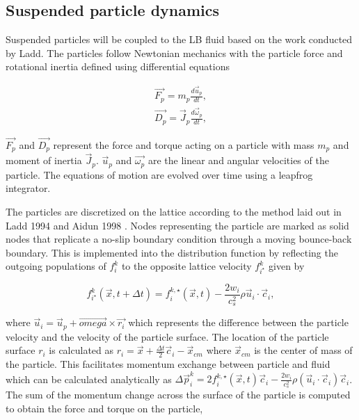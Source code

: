 
\subsection{Suspended particle dynamics}
\label{section:lbm_colloids}

Suspended particles will be coupled to the LB fluid based on the work conducted by Ladd. \cite{ladd_numerical_1994, 
aidun_direct_1998, ladd_lattice-boltzmann_2001} The particles follow Newtonian mechanics with the particle force and
rotational inertia defined using differential equations

\begin{equation}
    \begin{split}
    \vec{F_p} = m_p \frac{d \vec{u}_p}{dt} , \\
    \vec{D_p} = \vec{J}_p \frac{d \vec{\omega}_p}{dt} ,
    \label{eq:md}
    \end{split}
\end{equation}

$\vec{F_p}$ and $\vec{D_p}$ represent the force and torque acting on a particle with mass $m_p$ and moment of inertia 
$\vec{J}_p$. $\vec{u}_p$ and $\vec{\omega_{p}}$ are the linear and angular velocities of the particle. The equations of 
motion are evolved over time using a leapfrog integrator. \cite{jansen_bijels_2011}

The particles are discretized on the lattice according to the method laid out in Ladd 1994 and Aidun 1998
\cite{ladd_numerical_1994,aidun_direct_1998}. Nodes representing the particle are marked as solid nodes that replicate
a no-slip boundary condition through a moving bounce-back boundary. This is implemented into the distribution function
by reflecting the outgoing populations of $f_i^k$ to the opposite lattice velocity $f^k_{i^\star}$ given by

\begin{equation}
    f^k_{i^\star}(\vec{x}, t+\Delta t) = f^{k,\star}_i(\vec{x}, t) - \frac{2w_i}{c_s^2} \rho \vec{u}_i \cdot \vec{c}_i ,
\end{equation}

where $\vec{u}_i = \vec{u}_p + \vec{omega}\times \vec{r_i}$ which represents the difference between the particle velocity and the 
velocity of the particle surface. The location of the particle surface $r_i$ is calculated as $r_i = \vec{x} + \frac{\Delta t}{2}\vec{c}_i - \vec{x}_{cm}$ 
where $\vec{x}_{cm}$ is the center of mass of the particle.
This facilitates momentum exchange between particle and fluid which can be calculated analytically as 
\(\Delta\vec{p}^k_i = 2 f^{k,\star}_i(\vec{x},t)\vec{c}_i - \frac{2w_i}{c_s^2}\rho(\vec{u}_i\cdot\vec{c}_i)\vec{c}_i\).
The sum of the momentum change across the surface of the particle is computed to obtain the force and torque on the particle,

